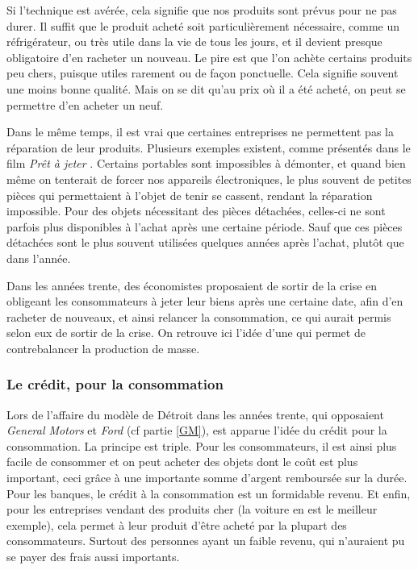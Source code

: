 Si l'\op technique est avérée, cela signifie que nos produits sont prévus pour ne pas durer. Il suffit que le produit acheté soit particulièrement nécessaire, comme un réfrigérateur, ou très utile dans la vie de tous les jours, et il devient presque obligatoire d'en racheter un nouveau. Le pire est que l'on achète certains produits peu chers, puisque utiles rarement ou de façon ponctuelle. Cela signifie souvent une moins bonne qualité. Mais on se dit qu'au prix où il a été acheté, on peut se permettre d'en acheter un neuf.

\bigbreak
Dans le même temps, il est vrai que certaines entreprises ne permettent pas la réparation de leur produits. Plusieurs exemples existent, comme présentés dans le film \textit{Prêt à jeter} \cite{PretAjeter}. Certains portables sont impossibles à démonter, et quand bien même on tenterait de forcer nos appareils électroniques, le plus souvent de petites pièces qui permettaient à l'objet de tenir se cassent, rendant la réparation impossible. Pour des objets nécessitant des pièces détachées, celles-ci ne sont parfois plus disponibles à l'achat après une certaine période. Sauf que ces pièces détachées sont le plus souvent utilisées quelques années après l'achat, plutôt que dans l'année.

\bigbreak
Dans les années trente, des économistes proposaient de sortir de la crise en obligeant les consommateurs à jeter leur biens après une certaine date, afin d'en racheter de nouveaux, et ainsi relancer la consommation, ce qui aurait permis selon eux de sortir de la crise. On retrouve ici l'idée d'une \op qui permet de contrebalancer la production de masse. 


\subsubsection{Le crédit, pour la consommation}
Lors de l'affaire du modèle de Détroit dans les années trente, qui opposaient \textit{General Motors} et \textit{Ford} (cf partie \ref{GM}), est apparue l'idée du crédit pour la consommation. La principe est triple. Pour les consommateurs, il est ainsi plus facile de consommer et on peut acheter des objets dont le coût est plus important, ceci grâce à une importante somme d'argent remboursée sur la durée. Pour les banques, le crédit à la consommation est un formidable revenu. Et enfin, pour les entreprises vendant des produits cher (la voiture en est le meilleur exemple), cela permet à leur produit d'être acheté par la plupart des consommateurs. Surtout des personnes ayant un faible revenu, qui n'auraient pu se payer des frais aussi importants.

